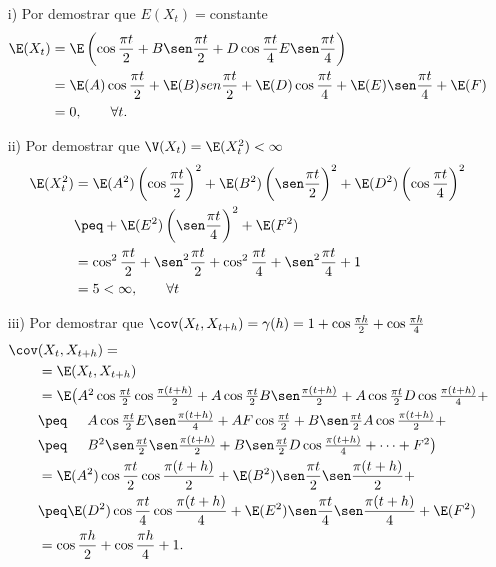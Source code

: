 \begin{ejemplo}
\begin{enumerate}
	\begin{enumerate}
	\item[i)] Por demostrar que $E(X_{t} )=$constante
	\begin{align*}
	\E(X_{t} )& =\E\left( {\cos \frac{\pi t}{2}+B\sen\frac{\pi t}{2}+D\cos \frac{\pi t}{4}E\sen\frac{\pi t}{4}} \right)\\
		&=\E(A)\cos \frac{\pi t}{2}+\E(B)sen\frac{\pi t}{2}+\E(D)\cos \frac{\pi t}{4}+\E(E)\sen\frac{\pi t}{4}+\E(F)\\
		&=0, \qquad\forall t.
	\end{align*}

	\item[ii)] Por demostrar que $\V(X_t)=\E(X_{t}^{2} )<\infty $
	\begin{align*}
	\E(X_{t}^{2} )&= \E(A^{2})\left(\cos \frac{\pi t}{2}\right)^{2}+\E(B^{2})\left(  \sen\frac{\pi t}{2} \right)^{2}+\E(D^{2})\left(\cos \frac{\pi t}{4}\right)^{2}\\
		&\peq+\E(E^{2})\left( \sen\frac{\pi t}{4} \right)^{2}+\E(F^{2})\\
		&=\cos^{2}\frac{\pi t}{2}+\sen^{2}\frac{\pi t}{2}+\cos^{2}\frac{\pi t}{4}+\sen^{2}\frac{\pi t}{4}+1\\
		&=5<\infty,\qquad \forall t
	\end{align*}

	\item[iii)] Por demostrar que $\cov(X_{t}, X_{t+h} )=\gamma (h)=1+\cos \frac{\pi h}{2}+\cos \frac{\pi h}{4}$
	\begin{align*}
	\cov&(X_{t},X_{t+h})=\\
		&=\E(X_{t},X_{t+h} )\\
		& =\textstyle\E\big( A^{2}\cos \frac{\pi t}{2}\cos \frac{\pi (t+h)}{2}+A\cos \frac{\pi t}{2}B\sen\frac{\pi (t+h)}{2}+A\cos \frac{\pi t}{2}D\cos \frac{\pi (t+h)}{4}+\\
		&\peq\phantom{\E(}\textstyle A\cos \frac{\pi t}{2}E\sen\frac{\pi (t+h)}{4}+AF\cos \frac{\pi t}{2}+B\sen\frac{\pi t}{2}A\cos \frac{\pi (t+h)}{2}+\\
		&\peq\phantom{\E(}\textstyle B^{2}\sen\frac{\pi t}{2}\sen\frac{\pi (t+h)}{2}+B\sen\frac{\pi t}{2}D\cos \frac{\pi (t+h)}{4}+\cdots +F^{2}\big)\\
		&=\E(A^{2})\cos \frac{\pi t}{2}\cos \frac{\pi (t+h)}{2}+\E(B^{2})\sen\frac{\pi t}{2}\sen\frac{\pi (t+h)}{2}+\\
		& \peq \E(D^{2})\cos \frac{\pi t}{4}\cos \frac{\pi (t+h)}{4}+\E(E^{2})\sen\frac{\pi t}{4}\sen\frac{\pi (t+h)}{4}+\E(F^{2})\\
		& =\cos \frac{\pi h}{2}+\cos \frac{\pi h}{4}+1.
	\end{align*}
	\end{enumerate}
\end{enumerate}
\end{ejemplo}

